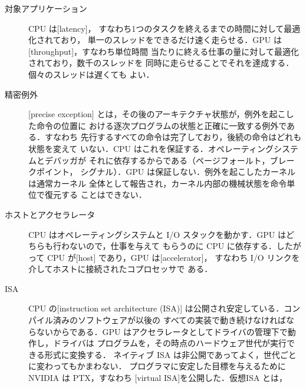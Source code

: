 \documentclass[../main.tex]{subfiles}
\begin{document}
\begin{description}
  \item[対象アプリケーション] CPU は[latency]，
    すなわち1つのタスクを終えるまでの時間に対して最適化されており，
    単一のスレッドをできるだけ速く走らせる．GPU は
    [throughput]，すなわち単位時間
    当たりに終える仕事の量に対して最適化されており，数千のスレッドを
    同時に走らせることでそれを達成する．個々のスレッドは遅くても
    よい．
  \item[精密例外] [precise exception]
    とは，その後のアーキテクチャ状態が，例外を起こした命令の位置に
    おける逐次プログラムの状態と正確に一致する例外である．すなわち
    先行するすべての命令は完了しており，後続の命令はどれも状態を変えて
    いない．CPU はこれを保証する．オペレーティングシステムとデバッガが
    それに依存するからである（ページフォールト，ブレークポイント，
    シグナル）．GPU は保証しない．例外を起こしたカーネルは通常カーネル
    全体として報告され，カーネル内部の機械状態を命令単位で復元する
    ことはできない．
  \item[ホストとアクセラレータ] CPU はオペレーティングシステムと I/O
    スタックを動かす．GPU はどちらも行わないので，仕事を与えて
    もらうのに CPU に依存する．したがって CPU が[host]
    であり，GPU は[accelerator]，
    すなわち I/O リンクを介してホストに接続されたコプロセッサで
    ある．
  \item[ISA] CPU の[instruction set architecture (ISA)]
    は公開され安定している．コンパイル済みのソフトウェアが以後の
    すべての実装で動き続けなければならないからである．GPU はアクセラレータとしてドライバの管理下で動作し，ドライバは
    プログラムを，その時点のハードウェア世代が実行できる形式に変換する．
    ネイティブ ISA は非公開であってよく，世代ごとに変わってもかまわない．
    プログラマに安定した目標を与えるために NVIDIA は PTX，すなわち
    [virtual ISA]を公開した．仮想ISA とは，

\end{description}
\end{document}
